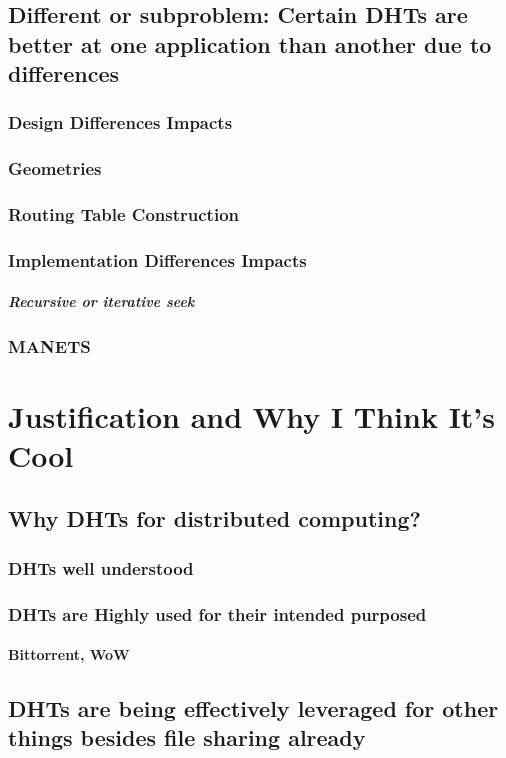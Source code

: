 \documentclass[10pt,letterpaper]{report}
\begin{document}
\section{Different or subproblem: Certain DHTs are better at one application than another due to differences}
\subsection{Design Differences Impacts}
\subsection{Geometries}
\subsection{Routing Table Construction}
\subsection{Implementation Differences Impacts}
\paragraph{Recursive or iterative seek}


\subsection{MANETS}
\chapter{Justification and Why I Think It's Cool}

\section{Why DHTs for distributed computing?}
\subsection{DHTs well understood}
\subsection{DHTs are Highly used for their intended purposed}
\subsubsection{Bittorrent, WoW}
\section{DHTs are being effectively leveraged for other things besides file sharing already}
\end{document}
